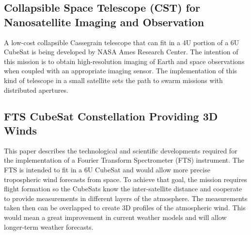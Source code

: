 \subsection{Collapsible Space Telescope (CST) for Nanosatellite Imaging and Observation}

A low-cost collapsible Cassegrain telescope that can fit in a 4U portion of a 6U CubeSat is being developed by NASA Ames Research Center. The intention of this mission is to obtain high-resolution imaging of Earth and space observations when coupled with an appropriate imaging sensor. The implementation of this kind of telescope in a small satellite sets the path to swarm missions with distributed apertures.\cite{Elwood_CollapsibleTelescope}

\subsection{FTS CubeSat Constellation Providing 3D Winds}

This paper describes the technological and scientific developments required for the implementation of a Fourier Transform Spectrometer (FTS) instrument. The FTS is intended to fit in a 6U CubeSat and would allow more precise tropospheric wind forecasts from space. To achieve that goal, the mission requires flight formation so the CubeSats know the inter-satellite distance and cooperate to provide measurements in different layers of the atmosphere. The measurements taken then can be overlapped to create 3D profiles of the atmospheric wind. This would mean a great improvement in current weather models and will allow longer-term weather forecasts. \cite{Wloszek_3Dwinds}